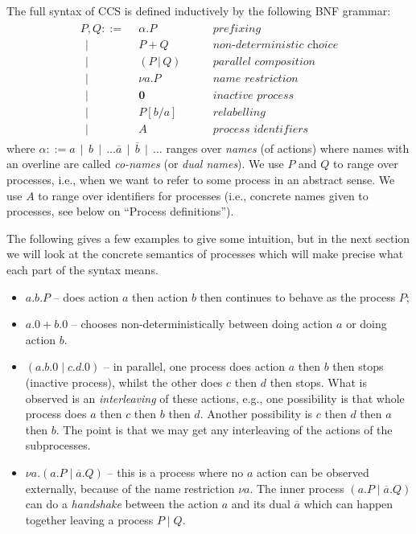 \documentclass{article}
\theoremstyle{definition}
\begin{document}
The full syntax of CCS is defined inductively by the following BNF grammar:
%
\begin{align*}
  \begin{array}{rll}
  P, Q ::= \;\, & \alpha . P & \qquad \textit{prefixing} \\
    \;\,\mid & P + Q & \qquad \textit{non-deterministic choice}  \\
    \;\,\mid &  (P \, | \, Q) & \qquad \textit{parallel composition} \\
    \;\,\mid & \nu a . P & \qquad \textit{name restriction} \\
    \;\,\mid & \mathbf{0} & \qquad \textit{inactive process} \\
    \;\,\mid & P[b/a] & \qquad \textit{relabelling} \\
    \;\,\mid & A & \qquad \textit{process identifiers}
  \end{array}
\end{align*}
%
where  $\alpha ::= a \,\mid\, b \,\mid\, \ldots \overline{a} \,\mid\,
\overline{b} \,\mid\, \ldots$
ranges over \emph{names} (of actions)
where names with an overline are called \emph{co-names} (or \emph{dual
  names}). We use $P$ and $Q$ to range over processes, i.e., when
we want to refer to some process in an abstract sense. We use
$A$ to range over identifiers for processes (i.e., concrete names
given to processes, see below on ``Process definitions'').

The following gives a few examples to give some intuition, but in the
next section we will look at the concrete semantics of processes
which will make precise what each part of the syntax means.
%
\begin{itemize}
  \item $a. b. P$ -- does action $a$ then action $b$ then continues to
  behave as the process $P$;
  \item $a.0 + b.0$ -- chooses non-deterministically between doing
  action $a$ or doing action $b$.
  \item $(a.b.0 \mid c.d.0)$ -- in parallel, one process does action $a$
  then $b$ then stops (inactive process), whilst the other does $c$
  then $d$ then stops. What is observed is an \emph{interleaving} of
  these actions, e.g., one possibility is that whole process does
  $a$ then $c$ then $b$ then $d$. Another possibility is $c$ then $d$
  then $a$ then $b$. The point is that we may get any interleaving of
  the actions of the subprocesses.
  \item $\nu a . (a . P \mid \overline{a} . Q)$ -- this is a process
  where no $a$ action can be observed externally, because of the name
  restriction $\nu a $. The inner process $(a . P \mid \overline{a}
  . Q)$ can do a \emph{handshake} between the action $a$ and its dual
  $\overline{a}$ which can happen together leaving a process $P \mid Q$.
\end{itemize}
%
\end{document}
